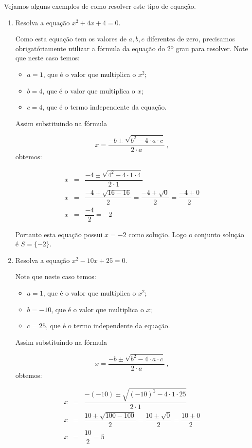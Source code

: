  \begin{exem} Vejamos alguns exemplos de como resolver este tipo de equação.
 \begin{enumerate}[1)]
 \item Resolva a equação $x^2 + 4x + 4= 0$.

 Como esta equação tem os valores de $a, b, c$ diferentes de zero, precisamos obrigatóriamente utilizar a fórmula da equação do 2º grau para resolver. Note que neste caso temos:
  \begin{itemize}
  \item $a= 1$, que é o valor que multiplica o $x^2$;
  \item $b= 4$, que é o valor que multiplica o $x$;
  \item $c= 4$, que é o termo independente da equação.
  \end{itemize}
  Assim substituindo na fórmula

 \[x = \dfrac{-b \pm \sqrt{b^2 - 4 \cdot a \cdot c}}{2 \cdot a} \ ,\]
 obtemos:

 \begin{eqnarray*}
 x &=& \dfrac{-4 \pm \sqrt{4^2 - 4 \cdot 1 \cdot 4}}{2 \cdot 1} \\
 x &=& \dfrac{-4 \pm \sqrt{16 - 16}}{2}= \dfrac{-4 \pm \sqrt{0}}{2}= \dfrac{-4 \pm 0}{2} \\
 x &=& \dfrac{-4}{2}= -2
 \end{eqnarray*}

 Portanto esta equação possui $x= -2$ como solução. Logo o conjunto solução é $S= \{-2\}$.

 \item Resolva a equação $x^2 - 10x + 25= 0$.

 Note que neste caso temos:
  \begin{itemize}
  \item $a= 1$, que é o valor que multiplica o $x^2$;
  \item $b= -10$, que é o valor que multiplica o $x$;
  \item $c= 25$, que é o termo independente da equação.
  \end{itemize}
  Assim substituindo na fórmula

 \[x = \dfrac{-b \pm \sqrt{b^2 - 4 \cdot a \cdot c}}{2 \cdot a} \ ,\]
 obtemos:

 \begin{eqnarray*}
 x &=& \dfrac{-(-10) \pm \sqrt{(-10)^2 - 4 \cdot 1 \cdot 25}}{2 \cdot 1} \\
 x &=& \dfrac{10 \pm \sqrt{100 - 100}}{2}= \dfrac{10 \pm \sqrt{0}}{2}= \dfrac{10 \pm 0}{2} \\
 x &=& \dfrac{10}{2}= 5
 \end{eqnarray*}


\end{enumerate}
\end{exem}
